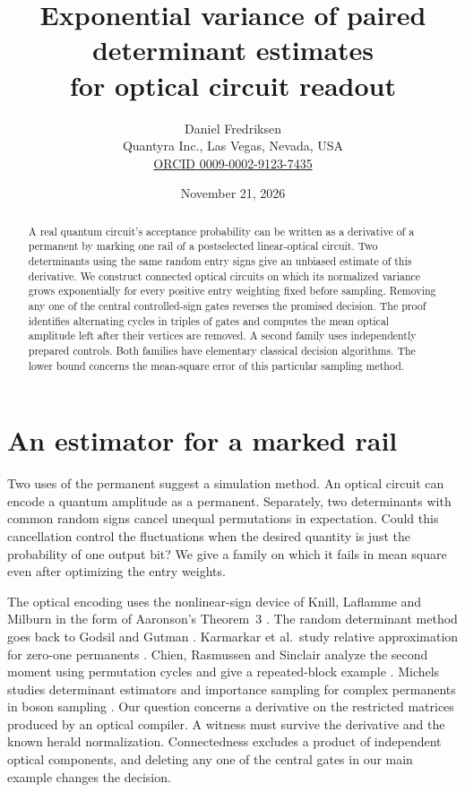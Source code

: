 \documentclass[11pt]{article}
\title{Exponential variance of paired determinant estimates\\for optical circuit readout}
\author{Daniel Fredriksen\\{\small Quantyra Inc., Las Vegas, Nevada, USA}\\
{\small\href{https://orcid.org/0009-0002-9123-7435}{ORCID 0009-0002-9123-7435}}}
\date{November 21, 2026}
\begin{document}
\maketitle
\begin{abstract}
A real quantum circuit's acceptance probability can be written as a derivative of a permanent by marking one rail of a postselected linear-optical circuit. Two determinants using the same random entry signs give an unbiased estimate of this derivative. We construct connected optical circuits on which its normalized variance grows exponentially for every positive entry weighting fixed before sampling. Removing any one of the central controlled-sign gates reverses the promised decision. The proof identifies alternating cycles in triples of gates and computes the mean optical amplitude left after their vertices are removed. A second family uses independently prepared controls. Both families have elementary classical decision algorithms. The lower bound concerns the mean-square error of this particular sampling method.
\end{abstract}

\section{An estimator for a marked rail}
Two uses of the permanent suggest a simulation method. An optical circuit can encode a quantum amplitude as a permanent. Separately, two determinants with common random signs cancel unequal permutations in expectation. Could this cancellation control the fluctuations when the desired quantity is just the probability of one output bit? We give a family on which it fails in mean square even after optimizing the entry weights.

The optical encoding uses the nonlinear-sign device of Knill, Laflamme and Milburn \cite{klm} in the form of Aaronson's Theorem~3 \cite{aaronson}. The random determinant method goes back to Godsil and Gutman \cite{gg}. Karmarkar et al.\ study relative approximation for zero-one permanents \cite{kklll}. Chien, Rasmussen and Sinclair analyze the second moment using permutation cycles and give a repeated-block example \cite[Secs.~3.2--3.3]{crs}. Michels studies determinant estimators and importance sampling for complex permanents in boson sampling \cite[Sec.~4]{michels}. Our question concerns a derivative on the restricted matrices produced by an optical compiler. A witness must survive the derivative and the known herald normalization. Connectedness excludes a product of independent optical components, and deleting any one of the central gates in our main example changes the decision.
\end{document}
